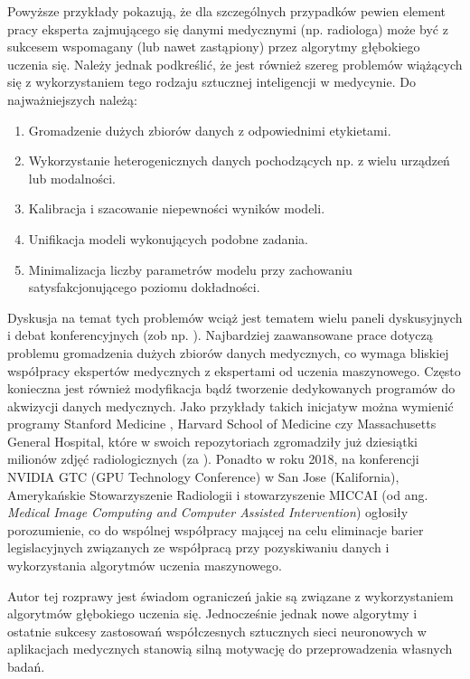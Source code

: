 Powyższe przykłady pokazują, że dla szczególnych przypadków pewien element pracy eksperta zajmującego się danymi medycznymi (np. radiologa) może być z sukcesem wspomagany (lub nawet zastąpiony) przez algorytmy głębokiego uczenia się. Należy jednak podkreślić, że jest również szereg problemów wiążących się z wykorzystaniem tego rodzaju sztucznej inteligencji w medycynie. Do najważniejszych należą:
\begin{enumerate}
	\item Gromadzenie dużych zbiorów danych z odpowiednimi etykietami.
	\item Wykorzystanie heterogenicznych danych pochodzących np. z wielu urządzeń lub modalności.
	\item Kalibracja i szacowanie niepewności wyników modeli.
	\item Unifikacja modeli wykonujących podobne zadania.
	\item Minimalizacja liczby parametrów modelu przy zachowaniu satysfakcjonującego poziomu dokładności.
\end{enumerate}

Dyskusja na temat tych problemów wciąż jest tematem wielu paneli dyskusyjnych i debat konferencyjnych (zob np. \cite{NVIDIApanel}). Najbardziej zaawansowane prace dotyczą problemu gromadzenia dużych zbiorów danych medycznych, co wymaga bliskiej współpracy ekspertów medycznych z ekspertami od uczenia maszynowego. Często konieczna jest również modyfikacja bądź tworzenie dedykowanych programów do akwizycji danych medycznych. Jako przykłady takich inicjatyw można wymienić programy Stanford Medicine \cite{MedicalImageNet}, Harvard School of Medicine \cite{HMS} czy Massachusetts General Hospital, które w swoich repozytoriach zgromadziły już dziesiątki milionów zdjęć radiologicznych (za \cite{MGH}). Ponadto w roku 2018, na konferencji NVIDIA GTC (GPU Technology Conference) w San Jose (Kalifornia), Amerykańskie Stowarzyszenie Radiologii i stowarzyszenie MICCAI (od ang. \textit{Medical Image Computing and Computer Assisted Intervention}) ogłosiły porozumienie, co do wspólnej współpracy mającej na celu eliminacje barier legislacyjnych związanych ze współpracą przy pozyskiwaniu danych i wykorzystania algorytmów uczenia maszynowego.

Autor tej rozprawy jest świadom ograniczeń jakie są związane z wykorzystaniem algorytmów głębokiego uczenia się. Jednocześnie jednak nowe algorytmy i ostatnie sukcesy zastosowań współczesnych sztucznych sieci neuronowych w aplikacjach medycznych stanowią silną motywację do przeprowadzenia własnych badań.


    
